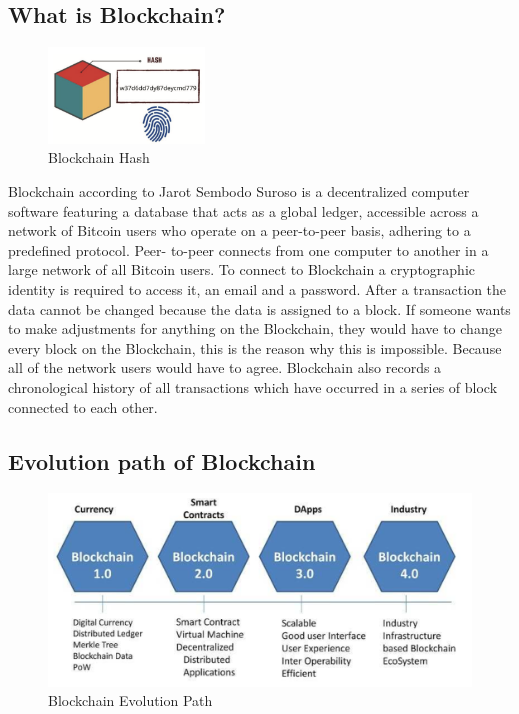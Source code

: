 \documentclass[10pt,english,a4paper]{article}
\begin{document}
\subsection{What is Blockchain?}
\begin{figure}
  \centering
  \includegraphics[width=0.37\textwidth]{Blockchain-hash.png} 
  \caption{Blockchain Hash\cite{Jain:Criminal:record}}
\end{figure} 
Blockchain according to Jarot Sembodo Suroso\cite{Suroso:SKCK} is a decentralized computer software featuring a database that acts as a global ledger, accessible across a network of Bitcoin users who operate on a peer-to-peer basis, adhering to a predefined protocol. Peer- to-peer connects from one computer to another in a large network of all Bitcoin users. To connect to Blockchain a cryptographic identity is required to access it, an email and a password. After a transaction the data cannot be changed because the data is assigned to a block. If someone wants to make adjustments for anything on the Blockchain, they would have to change every block on the Blockchain, this is  the reason why this is impossible. Because all of the network users would have to agree. Blockchain also records a chronological history of all transactions which have occurred in a series of block connected to each other.\cite{Suroso:SKCK}

\subsection{Evolution path of Blockchain}
\begin{figure}[h]
    \centering
    \includegraphics[scale=0.4]{Blockchain-evolution.png}
    \caption{Blockchain Evolution Path \cite{Suroso:SKCK}}
    \label{histogram}
\end{figure}
\end{document}
